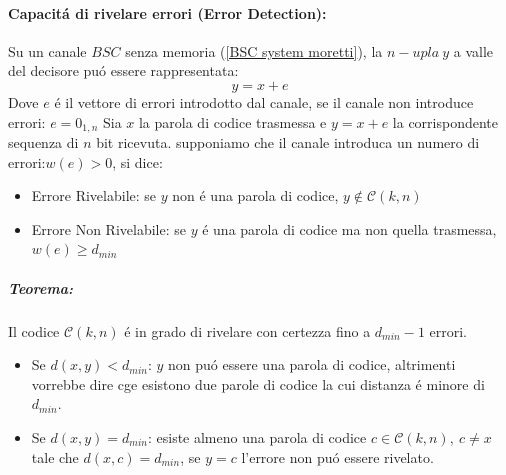             \paragraph{Capacitá di rivelare errori (Error Detection):}
                Su un canale $BSC$ senza memoria (\ref{BSC system moretti}), la $n-upla\ y$ a valle del decisore puó essere rappresentata:
                \[
                    y=x+e  
                \] 
                Dove $e$ é il vettore di errori introdotto dal canale, se il canale non introduce errori: $e = 0_{1,n}$
                Sia $x$ la parola di codice trasmessa e $y=x+e$ la corrispondente sequenza di $n$ bit ricevuta. supponiamo che il canale 
                introduca un numero di errori:$w(e) > 0$, si dice:
                \begin{itemize}
                    \item {
                        Errore Rivelabile: se $y$ non é una parola di codice, $y\notin\mathcal{C}(k,n) $
                    }
                    \item {
                        Errore Non Rivelabile: se $y$ é una parola di codice ma non quella trasmessa, $w(e) \geq d_{min}$ 
                    }
                \end{itemize} 
                \subparagraph{Teorema:} Il codice $\mathcal{C}(k,n)$ é in grado di rivelare con certezza fino a $d_{min}-1$ errori.
                \begin{itemize}
                    \item {
                        Se $d(x,y)<d_{min}$: $y$ non puó essere una parola di codice, altrimenti vorrebbe dire cge esistono due parole di codice la cui distanza 
                        é minore di $d_{min}$.
                    }
                    \item {
                        Se $d(x,y)=d_{min}$: esiste almeno una parola di codice $c\in\mathcal{C}(k,n),\ c \neq x$ tale che $d(x,c)=d_{min}$, se $y=c$ l'errore non 
                        puó essere rivelato. 
                    }
                \end{itemize}

